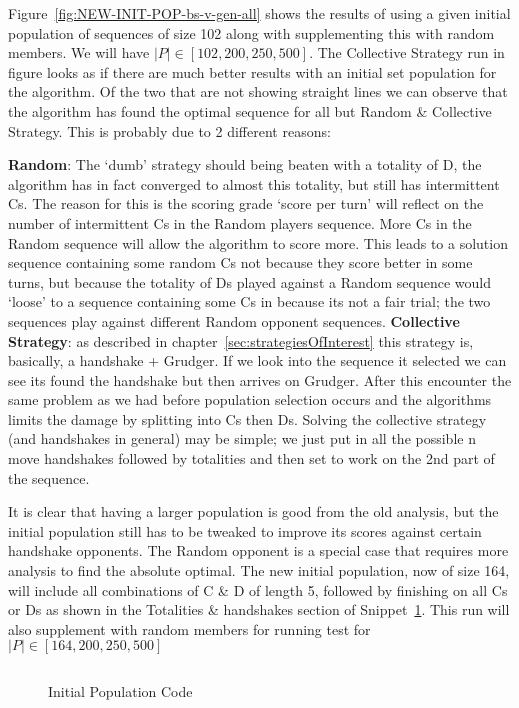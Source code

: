 Figure~\ref{fig:NEW-INIT-POP-bs-v-gen-all} shows the results of using a given initial population of sequences of size 102 along with supplementing this with random members.
We will have \(|P| \in [102,200,250,500]\).
The Collective Strategy run in figure looks as if there are much better results with an initial set population for the algorithm.
Of the two that are not showing straight lines we can observe that the algorithm has found the optimal sequence for all but Random \& Collective Strategy.
This is probably due to 2 different reasons:

\textbf{Random}: The `dumb' strategy should being beaten with a totality of D, the algorithm has in fact converged to almost this totality, but still has intermittent Cs.
The reason for this is the scoring grade `score per turn' will reflect on the number of intermittent Cs in the Random players sequence.
More Cs in the Random sequence will allow the algorithm to score more.
This leads to a solution sequence containing some random Cs not because they score better in some turns, but because the totality of Ds played against
a Random sequence would `loose' to a sequence containing some Cs in because its not a fair trial;
the two sequences play against different Random opponent sequences.
\textbf{Collective Strategy}: as described in chapter~\ref{sec:strategiesOfInterest} this strategy is, basically, a handshake + Grudger.
If we look into the sequence it selected we can see its found the handshake but then arrives on Grudger.
After this encounter the same problem as we had before population selection occurs and the algorithms limits the damage by splitting into Cs then Ds. Solving the collective strategy (and handshakes in general) may be simple;
we just put in all the possible n move handshakes followed by totalities and then set to work on the 2nd part of the sequence.

It is clear that having a larger population is good from the old analysis, but the initial population still has to be tweaked to improve its scores against certain handshake opponents.
The Random opponent is a special case that requires more analysis to find the absolute optimal.
The new initial population, now of size 164, will include all combinations of C \& D of length 5, followed by finishing on all Cs or Ds as shown in the Totalities \& handshakes section of Snippet~\ref{code:initialPopulationCode}.
This run will also supplement with random members for running test for \(|P| \in [164,200,250,500]\)

\begin{figure}
    \inputminted{python}{code_snippets/initialPopulationCode.py}
    \caption{Initial Population Code}\label{code:initialPopulationCode}
\end{figure}

